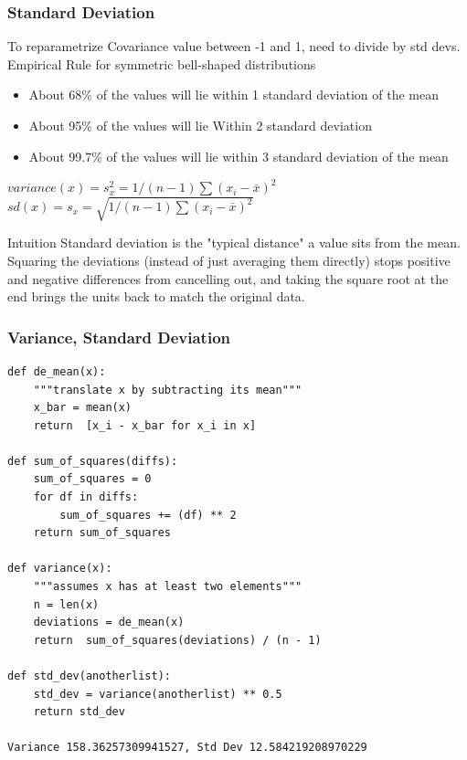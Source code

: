 \begin{frame}[fragile]\frametitle{Standard Deviation}	
To reparametrize Covariance value between -1 and 1, need to divide by std devs. Empirical Rule for symmetric bell-shaped distributions
\begin{itemize}
\item About 68\% of the values will lie within 1 standard deviation of the mean
\item About 95\% of the values will lie Within 2 standard deviation
\item About 99.7\% of the values will lie within 3 standard deviation of the mean
\end{itemize}
$variance(x) = s_x^2 = 1/(n-1)\sum (x_i - \bar{x})^2$
$sd(x) = s_x = \sqrt{1/(n-1)\sum (x_i - \bar{x})^2}$

\begin{block}{Intuition}
Standard deviation is the "typical distance" a value sits from the mean. Squaring the deviations (instead of just averaging them directly) stops positive and negative differences from cancelling out, and taking the square root at the end brings the units back to match the original data.
\end{block}
\end{frame}

 


\begin{frame}[fragile]\frametitle{Variance, Standard Deviation}
\begin{lstlisting}
def de_mean(x):
	"""translate x by subtracting its mean"""
	x_bar = mean(x)
	return	[x_i - x_bar for x_i in x]

def sum_of_squares(diffs):
	sum_of_squares = 0
	for df in diffs:
		sum_of_squares += (df) ** 2
	return sum_of_squares

def variance(x):
	"""assumes x has at	least two elements"""
	n = len(x)
	deviations = de_mean(x)
	return	sum_of_squares(deviations) / (n - 1)
 
def std_dev(anotherlist):
	std_dev = variance(anotherlist) ** 0.5
	return std_dev

Variance 158.36257309941527, Std Dev 12.584219208970229
\end{lstlisting}
\end{frame}


